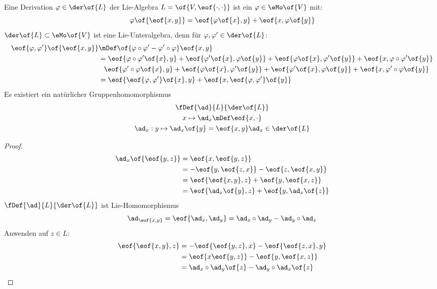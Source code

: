 \begin{definition}
	Eine Derivation $\varphi\in \der\of{L}$ der Lie-Algebra $L = \of{V,\eof{\cdot,\cdot}}$ ist ein $\varphi\in \eMo\of{V}$ mit:
	\begin{equation}
		\varphi\of{\eof{x,y}} = \eof{\varphi\of{x},y} + \eof{x,\varphi\of{y}}
	\end{equation}
	$\der\of{L} \subset \eMo\of{V}$ ist eine Lie-Unteralgebra, denn für $\varphi,\varphi' \in \der\of{L}$:
	\begin{equation}
		\begin{split}
			\eof{\varphi,\varphi'}\of{\eof{x,y}} & \mDef\of{\varphi\circ\varphi' - \varphi'\circ\varphi}\eof{x,y} \\
			& = \eof{\varphi\circ\varphi'\of{x},y} + \eof{\varphi'\of{x},\varphi\of{y}} + \eof{\varphi\of{x},\varphi'\of{y}} + \eof{x,\varphi\circ\varphi'\of{y}} \\
			& \phantom{=} \eof{\varphi'\circ\varphi\of{x},y} + \eof{\varphi\of{x},\varphi'\of{y}} + \eof{\varphi'\of{x},\varphi\of{y}} + \eof{x,\varphi'\circ\varphi\of{y}} \\
			& = \eof{\eof{\varphi,\varphi'}\of{x},y} + \eof{x,\eof{\varphi,\varphi'}\of{y}}
		\end{split}
	\end{equation}
	Es existiert ein natürlicher Gruppenhomomorphismus
	\begin{gather}
		\fDef{\ad}{L}{\der\of{L}} \\
		x \mapsto \ad_x\mDef \eof{x,\cdot} \\
		\ad_x : y \mapsto \ad_x\of{y} = \eof{x,y}
		\ad_x \in \der\of{L}
	\end{gather}
\end{definition}
\begin{proof}
	\begin{equation}
		\begin{split}
			\ad_x\of{\eof{y,z}} & = \eof{x,\eof{y,z}} \\
			& = - \eof{y,\eof{z,x}} - \eof{z,\eof{x,y}} \\
			& = \eof{\eof{x,y},z} + \eof{y,\eof{x,z}} \\
			& = \eof{\ad_x\of{y},z} + \eof{y,\ad_x\of{z}}
		\end{split}
	\end{equation}
	$\fDef{\ad}{L}{\der\of{L}}$ ist Lie-Homomorphismus
	\begin{equation}
		\ad_{\eof{x,y}} = \eof{\ad_x,\ad_y} = \ad_x \circ \ad_y - \ad_y\circ\ad_x
	\end{equation}
	Anwenden auf $z \in L$:
	\begin{equation}
		\begin{split}
			\eof{\eof{x,y},z} & = - \eof{\eof{y,z},x} - \eof{\eof{z,x},y} \\
			& = \eof{x\eof{y,z}} - \eof{y,\eof{x,z}} \\
			& = \ad_x\circ\ad_y\of{z} - \ad_y\circ\ad_x\of{z}
		\end{split}
	\end{equation}
\end{proof}
